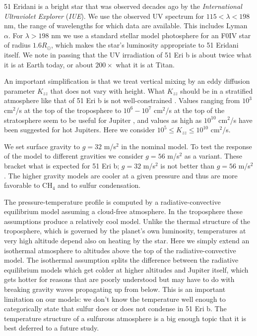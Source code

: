 \documentclass[preprint]{aastex}
\begin{document}
51 Eridani is a bright star that was observed decades ago by the {\it International Ultraviolet Explorer} ({\it IUE}).
We use the observed {UV} spectrum for $115 < \lambda < 198$ nm, the range of wavelengths
 for which data are available.   
 {\color{red} This includes Lyman $\alpha$.} 
For $\lambda > 198$ nm we use a standard stellar model photosphere for an F0IV star of
 radius $1.6 R_{\odot}$, which makes the star's luminosity appropriate to 51 Eridani itself.
We note in passing that the {UV} irradiation of 51 Eri b is about twice what it is at Earth today,
or about $200\times$ what it is at Titan.  

An important simplification is that we treat vertical mixing by an eddy diffusion parameter $K_{zz}$ that does
not vary with height.
What $K_{zz}$ should be in a stratified atmosphere like that of 51 Eri b is not well-constrained \citep{Freytag2010}. 
Values ranging from $10^3$ cm$^2$/s at the top of the troposphere to $10^6-10^7$ cm$^2$/s at the top of the stratosphere seem to be useful for Jupiter \citep{Moses2005}, and values as high as $10^{10} $ cm$^2$/s have been suggested for hot Jupiters.
Here we consider $10^{5} \leq K_{zz} \leq 10^{10} $ cm$^2$/s.

We set surface gravity to $g=32$ m/s$^2$ in the nominal model.
To test the response of the model to different gravities we consider $g=56$ m/s$^2$ as a variant.
These bracket what is expected for 51 Eri b; $g=32$ m/s$^2$ is not better than $g=56$ m/s$^2$.
The higher gravity models are cooler at a given pressure and thus are more favorable to CH$_4$ and to sulfur condensation.

 The pressure-temperature profile is computed by a radiative-convective equilibrium model assuming a cloud-free atmosphere.
 In the troposphere these assumptions produce a relatively cool model.
 Unlike the thermal structure of the troposphere, which is governed by the planet's own luminosity,
 temperatures at very high altitude depend also on heating by the star.    
 Here we simply extend an isothermal atmosphere to altitudes above the top of the radiative-convective model.
 {\color{red} The isothermal assumption splits the difference between the radiative equilibrium models which get colder at higher
 altitudes and Jupiter itself, which gets hotter for reasons that are poorly understood but may have to do with breaking gravity
 waves propagating up from below. }
 This is an important limitation on our models: we don't know the temperature well enough to categorically state
 that sulfur does or does not condense in 51 Eri b.
 The temperature structure of a sulfurous atmosphere is a big enough topic that it is best  
 deferred to a future study.   
\end{document}
